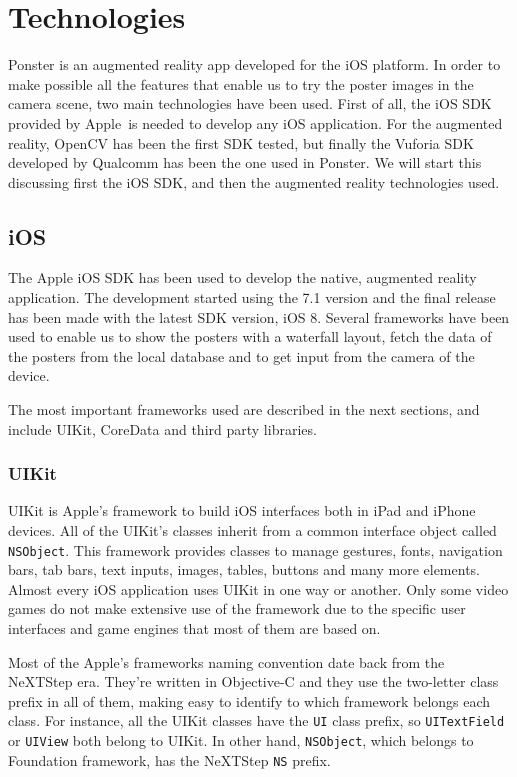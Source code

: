 \chapter{Technologies}
Ponster is an augmented reality app developed for the iOS platform. In order to make
possible all the features that enable us to try the poster images in the camera
scene, two main technologies have been used. First of all, the iOS SDK provided by
Apple\textregistered ~is needed to develop any iOS application. For the augmented reality, OpenCV
has been the first SDK tested, but finally the Vuforia SDK\cite{vuforia} developed
by Qualcomm has been the one used in Ponster. We will start this
discussing first the iOS SDK, and then the augmented reality technologies used.

\section{iOS}
The Apple iOS SDK has been used to develop the native, augmented reality
application. The development started using the 7.1 version and the final release has
been made with the latest SDK version, iOS 8. Several frameworks have been used to
enable us to show the posters with a waterfall layout, fetch the data of the posters
from the local database and to get input from the camera of the device.

The most important frameworks used are described in the next sections, and include
UIKit, CoreData and third party libraries.

\subsection{UIKit}
UIKit\cite{uikit} is Apple's framework to build iOS interfaces both in iPad and
iPhone devices. All of the UIKit's classes inherit from a common interface object
called \texttt{NSObject}. This framework provides classes to manage gestures, fonts,
navigation bars, tab bars, text inputs, images, tables, buttons and many more
elements. Almost every iOS application uses UIKit in one way or another. Only some
video games do not make extensive use of the framework due to the specific user
interfaces and game engines that most of them are based on.

Most of the Apple's frameworks naming convention date back from the NeXTStep era. They're written in
Objective-C and they use the two-letter class prefix in all of them, making easy to
identify to which framework belongs each class. For instance, all the UIKit classes
have the \texttt{UI} class prefix, so \texttt{UITextField} or \texttt{UIView} both
belong to UIKit. In other hand, \texttt{NSObject}, which belongs to Foundation
framework, has the NeXTStep \texttt{NS} prefix.

